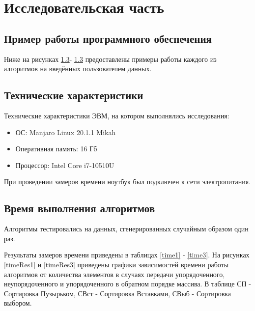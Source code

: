 \documentclass[12pt]{report}
\begin{document}
\chapter{Исследовательская часть}

\section{Пример работы программного обеспечения}
Ниже на рисунках \ref{}- \ref{} предоставлены примеры работы каждого из алгоритмов на введённых пользователем данных.



\newpage

\section{Технические характеристики}
Технические характеристики ЭВМ, на котором выполнялись исследования:
\begin{itemize}
\item ОС: Manjaro Linux 20.1.1 Mikah
\item Оперативная память: 16 Гб
\item Процессор: Intel Core i7-10510U
\end{itemize}


При проведении замеров времени ноутбук был подключен к сети электропитания.

\section{Время выполнения алгоритмов}
Алгоритмы тестировались на данных, сгенерированных случайным образом один раз.

Результаты замеров времени приведены в таблицах \ref{time1} - \ref{time3}. На рисунках \ref{timeRes1} и \ref{timeRes3} приведены графики зависимостей времени работы алгоритмов от количества элементов в случаях передачи упорядоченного, неупорядоченного и упорядоченного в обратном порядке массива. В таблице СП - Сортировка Пузырьком, СВст - Сортировка Вставками, СВыб - Сортировка выбором.
\end{document}
